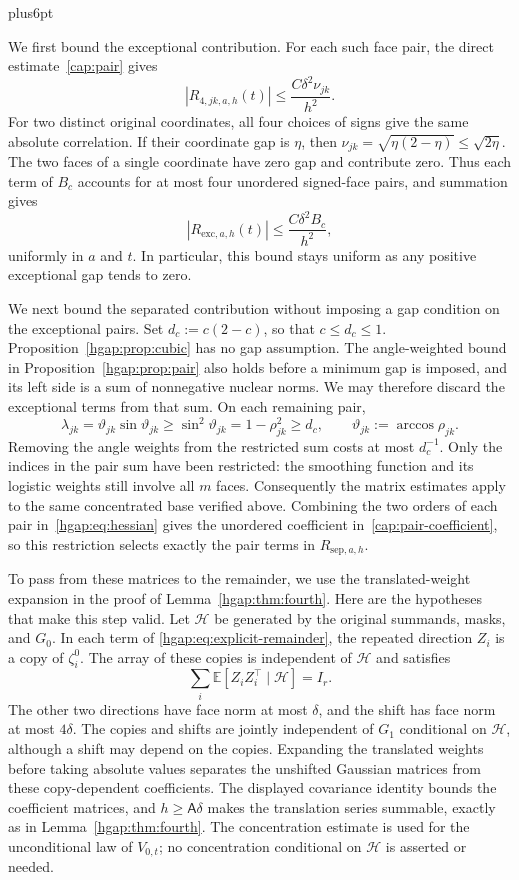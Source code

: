 \documentclass[11pt,letterpaper,twoside,leqno]{article}
\makeatletter
\theoremstyle{bookplain}
\theoremstyle{bookremark}
\renewenvironment{proof}[1][\proofname]{\par
  \pushQED{\qed}\normalfont\topsep6pt plus6pt\relax
  \trivlist\item[\hskip\labelsep\bfseries #1\@addpunct{.}]\ignorespaces
}{\popQED\endtrivlist\@endpefalse}
\newcommand{\E}{\mathbb E}
\makeatother
\begin{document}
\begin{proof}[Proof of Corollary~\ref{cor:correlation-budget}]
We first bound the exceptional contribution. For each such face
pair, the direct estimate~\eqref{cap:pair} gives
\[
 |R_{4,jk,a,h}(t)|\le\frac{C\delta^2\nu_{jk}}{h^2}.
\]
For two distinct original coordinates, all four choices of signs
give the same absolute correlation. If their coordinate gap is
$\eta$, then
$\nu_{jk}=\sqrt{\eta(2-\eta)}\le\sqrt{2\eta}$.
The two faces of a single coordinate have zero gap and contribute
zero. Thus each term of $B_c$ accounts for at most four unordered
signed-face pairs, and summation gives
\begin{equation}
 |R_{\mathrm{exc},a,h}(t)|
 \le\frac{C\delta^2B_c}{h^2},
 \label{budget:eq:exceptional}
\end{equation}
uniformly in $a$ and $t$. In particular, this bound stays uniform
as any positive exceptional gap tends to zero.

We next bound the separated contribution without imposing a gap
condition on the exceptional pairs. Set $d_c:=c(2-c)$, so that
$c\le d_c\le1$. Proposition~\ref{hgap:prop:cubic} has no gap
assumption. The angle-weighted bound in
Proposition~\ref{hgap:prop:pair} also holds before a minimum gap
is imposed, and its left side is a sum of nonnegative nuclear
norms. We may therefore discard the exceptional terms from that
sum. On each remaining pair,
\[
 \lambda_{jk}=\vartheta_{jk}\sin\vartheta_{jk}
 \ge\sin^2\vartheta_{jk}
 =1-\rho_{jk}^2\ge d_c,
 \qquad \vartheta_{jk}:=\arccos\rho_{jk}.
\]
Removing the angle weights from the restricted sum costs at most
$d_c^{-1}$. Only the indices in the pair sum have been restricted:
the smoothing function and its logistic weights still involve
all $m$ faces. Consequently the matrix estimates apply to the
same concentrated base verified above. Combining the two orders
of each pair in~\eqref{hgap:eq:hessian} gives the unordered
coefficient in~\eqref{cap:pair-coefficient}, so this restriction
selects exactly the pair terms in $R_{\mathrm{sep},a,h}$.

To pass from these matrices to the remainder, we use the
translated-weight expansion in the proof of
Lemma~\ref{hgap:thm:fourth}. Here are the hypotheses that make this
step valid. Let $\mathcal H$ be generated by the original summands,
masks, and $G_0$. In each term of
\eqref{hgap:eq:explicit-remainder}, the repeated direction $Z_i$
is a copy of $\zeta_i^0$. The array of these copies is independent
of $\mathcal H$ and satisfies
\[
 \sum_i\E[Z_iZ_i^\top\mid\mathcal H]=I_r.
\]
The other two directions have face norm at most $\delta$, and
the shift has face norm at most $4\delta$. The copies and shifts
are jointly independent of $G_1$ conditional on $\mathcal H$,
although a shift may depend on the copies. Expanding the translated
weights before taking absolute values separates the unshifted
Gaussian matrices from these copy-dependent coefficients. The
displayed covariance identity bounds the coefficient matrices,
and $h\ge\mathsf A\delta$ makes the translation series summable,
exactly as in Lemma~\ref{hgap:thm:fourth}. The concentration estimate
is used for the unconditional law of $V_{0,t}$; no concentration
conditional on $\mathcal H$ is asserted or needed.


\end{proof}
\end{document}
